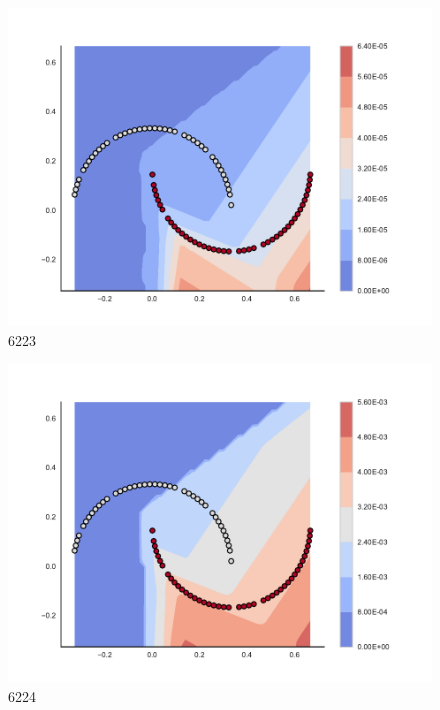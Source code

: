 \begin{subfigure}[b]{0.09\textwidth}
    \includegraphics[clip, trim=2.35cm 1.75cm 4.5cm 0cm,width=\textwidth]{img/convergence/6223.pdf}
    \caption{6223}
    \label{fig:convergence_6223}
\end{subfigure}
%
\begin{subfigure}[b]{0.09\textwidth}
    \includegraphics[clip, trim=2.35cm 1.75cm 4.5cm 0cm,width=\textwidth]{img/convergence/6224.pdf}
    \caption{6224}
    \label{fig:convergence_6224}
\end{subfigure}
%
